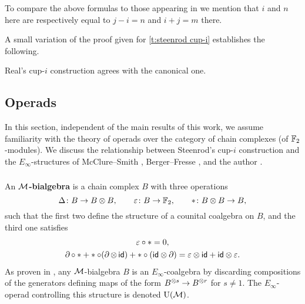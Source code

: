 \begin{remark}
	To compare the above formulas to those appearing in \cite[Corollary 3.2]{gonzalez-diaz1999steenrod} we mention that $i$ and $n$ here are respectively equal to $j-i=n$ and $i+j=m$ there.
\end{remark}

A small variation of the proof given for \cref{t:steenrod cup-i} establishes the following.

\begin{theorem}
	Real's \mbox{cup-$i$} construction agrees with the canonical one.
\end{theorem}

\subsection{Operads} \label{ss:operads}

In this section, independent of the main results of this work, we assume familiarity with the theory of operads over the category of chain complexes (of ${\mathbb{F}_2}$-modules).
We discuss the relationship between Steenrod's cup-$i$ construction and the $E_\infty$-structures of McClure--Smith \cite{mcclure2003multivariable}, Berger--Fresse \cite{berger2004combinatorial}, and the author \cite{medina2020prop1,medina2021prop2}.

\subsubsection{}

An \textbf{$\mathcal{M}$-bialgebra} is a chain complex $B$ with three operations
\[
\Delta \colon B \to B \otimes B, \qquad
\varepsilon \colon B \to {\mathbb{F}_2}, \qquad
\ast \colon B \otimes B \to B,
\]
such that the first two define the structure of a counital coalgebra on $B$, and the third one satisfies
\begin{gather*}
\varepsilon \circ \ast = 0, \\
\operatorname{\partial} \circ \ast + \ast \circ (\operatorname{\partial} \otimes \, \mathsf{id}) + \ast \circ (\mathsf{id} \otimes \operatorname{\partial}) =
\varepsilon \otimes \mathsf{id} + \mathsf{id} \otimes \varepsilon.
\end{gather*}
As proven in \cite{medina2020prop1}, any $\mathcal{M}$-bialgebra $B$ is an $E_\infty$-coalgebra by discarding compositions of the generators defining maps of the form $B^{\otimes s} \to B^{\otimes r}$ for $s \neq 1$.
The $E_\infty$-operad controlling this structure is denoted ${\operatorname{U}(\mathcal{M})}$.

